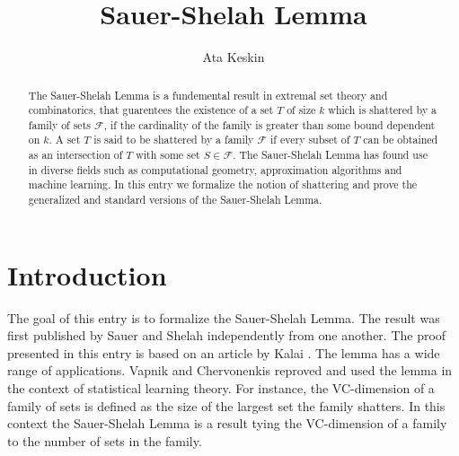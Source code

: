 \documentclass[11pt,a4paper]{article}
\begin{document}
\title{Sauer-Shelah Lemma}
\author{Ata Keskin}
\maketitle

\begin{abstract}
	The Sauer-Shelah Lemma is a fundemental result in extremal set theory and combinatorics, that guarentees the existence of a set $T$ of size $k$
	which is shattered by a family of sets $\mathcal{F}$, if the cardinality of the family is greater than some bound dependent on $k$. A set $T$ is
	said to be shattered by a family $\mathcal{F}$ if every subset of $T$ can be obtained as an intersection of $T$ with some set $S \in \mathcal{F}$.
	The Sauer-Shelah Lemma has found use in diverse fields such as computational geometry, approximation algorithms and machine learning. In this entry
	we formalize the notion of shattering and prove the generalized and standard versions of the Sauer-Shelah Lemma. 
\end{abstract}

\tableofcontents

\section{Introduction}

The goal of this entry is to formalize the Sauer-Shelah Lemma. The result was first published by Sauer \cite{SAUER1972145} and Shelah \cite{pjm/1102968432} independently from one another. The proof presented in this entry is based on an article by Kalai \cite{kalai_2008}. The lemma has a wide range of applications. Vapnik and Chervonenkis \cite{MR0288823} reproved and used the lemma in the context of statistical learning theory. For instance, the VC-dimension of a family of sets is defined as the size of the largest set the family shatters. In this context the Sauer-Shelah Lemma is a result tying the VC-dimension of a family to the number of sets in the family. 






\end{document}
